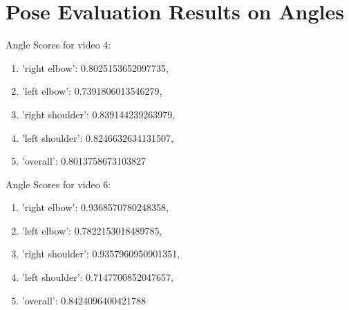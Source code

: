 \section{Pose Evaluation Results on Angles}

Angle Scores for video 4: 
  \begin{enumerate}
      \item 'right elbow': 0.8025153652097735, 
      \item 'left elbow': 0.7391806013546279, 
      \item 'right shoulder': 0.839144239263979, 
      \item 'left shoulder': 0.8246632634131507, 
      \item 'overall': 0.8013758673103827
  \end{enumerate}

  Angle Scores for video 6: 
  \begin{enumerate}
    \item 'right elbow': 0.9368570780248358, 
    \item 'left elbow': 0.7822153018489785, 
    \item 'right shoulder': 0.9357960950901351, 
    \item 'left shoulder': 0.7147700852047657, 
    \item 'overall': 0.8424096400421788
  \end{enumerate}

